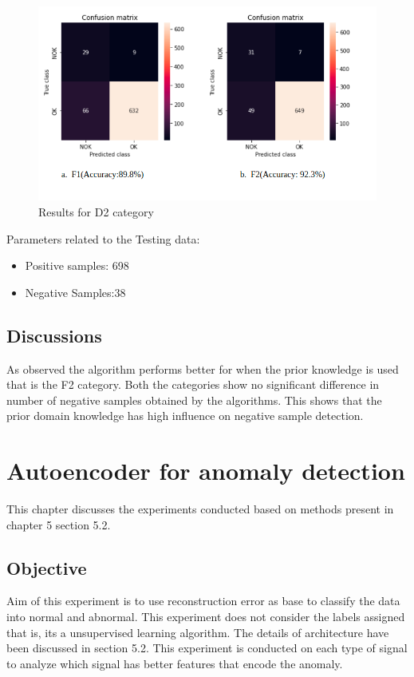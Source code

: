          \begin{figure}[b]
         	\centering
         	\includegraphics[width=1\linewidth]{images/r2.png}
         	\caption{Results for D2 category}
         	\label{r2}
         \end{figure}
  Parameters related to the Testing  data:
  \begin{itemize}
  	\item Positive samples: 698
  	
  \item	Negative Samples:38
  	
  \end{itemize}
 
  \section{Discussions}      
  
  As observed the algorithm performs better for  when the prior knowledge is used that is the F2 category. Both the categories show no significant difference in number of negative samples obtained by the algorithms. This shows that the prior domain knowledge has high influence on negative sample detection. 

  \chapter{Autoencoder for anomaly detection}
  This chapter discusses the experiments conducted based on methods present in chapter 5 section 5.2. 
  \section{Objective}
  Aim of this experiment is to use reconstruction error as base to classify the data into normal and abnormal. This experiment does not consider the labels assigned that is, its a unsupervised learning algorithm. The details of architecture have been discussed in section 5.2. 
  This experiment is conducted on each type of signal to analyze which signal has better features that encode the anomaly.
  
